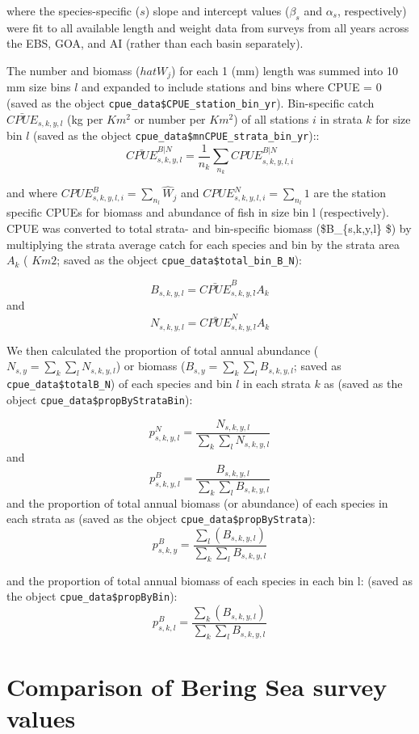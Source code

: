 \documentclass[
]{article}
\begin{document}
where the species-specific (\(s\)) slope and intercept values
(\(\beta_s\) and \(\alpha_s\), respectively) were fit to all available
length and weight data from surveys from all years across the EBS, GOA,
and AI (rather than each basin separately).

The number and biomass (\(hat{W_j}\)) for each 1 (mm) length was summed
into 10 mm size bins \(l\) and expanded to include stations and bins
where CPUE = 0 (saved as the object
\texttt{cpue\_data\$CPUE\_station\_bin\_yr}). Bin-specific catch
\(\bar{CPUE}_{s,k,y,l}\) (kg per \(Km^2\) or number per \(Km^2\)) of all
stations \(i\) in strata \(k\) for size bin \(l\) (saved as the object
\texttt{cpue\_data\$mnCPUE\_strata\_bin\_yr})::
\[\bar{CPUE}^{B|N}_{s,k,y,l}=\frac{1}{n_k}\sum_{n_k}{CPUE^{B|N}_{s,k,y,l,i}}\]

and where \(CPUE^B_{s,k,y,l,i} = \sum_{n_l}\hat{W}_j\) and
\(CPUE^N_{s,k,y,l,i} = \sum_{n_l}1\) are the station specific CPUEs for
biomass and abundance of fish in size bin l (respectively). CPUE was
converted to total strata- and bin-specific biomass (\$B\_\{s,k,y,l\}
\$) by multiplying the strata average catch for each species and bin by
the strata area \(A_{k}\) ( \(Km2\); saved as the object
\texttt{cpue\_data\$total\_bin\_B\_N}):

\[B_{s,k,y,l} =  \bar{CPUE}^{B}_{s,k,y,l} \dot{}A_{k}\] and
\[N_{s,k,y,l} =  \bar{CPUE}^{N}_{s,k,y,l} \dot{}A_{k}\]

We then calculated the proportion of total annual abundance
(\(N_{s,y}= \sum_k{\sum_l{N_{s,k,y,l}}}\)) or biomass
(\(B_{s,y}= \sum_k{\sum_l{B_{s,k,y,l}}}\); saved as
\texttt{cpue\_data\$totalB\_N}) of each species and bin \(l\) in each
strata \(k\) as (saved as the object
\texttt{cpue\_data\$propByStrataBin}):

\[p^N_{s,k,y,l} = \frac{N_{s,k,y,l}}{ \sum_k{\sum_l{N_{s,k,y,l}}}}\] and
\[p^B_{s,k,y,l} = \frac{B_{s,k,y,l}}{ \sum_k{\sum_l{B_{s,k,y,l}}}}\] and
the proportion of total annual biomass (or abundance) of each species in
each strata as (saved as the object \texttt{cpue\_data\$propByStrata}):
\[p^B_{s,k,y} = \frac{\sum_l({B_{s,k,y,l}})}{ \sum_k{\sum_l{B_{s,k,y,l}}}}\]

and the proportion of total annual biomass of each species in each bin
l: (saved as the object \texttt{cpue\_data\$propByBin}):
\[p^B_{s,k,l} = \frac{\sum_k({B_{s,k,y,l}})}{ \sum_k{\sum_l{B_{s,k,y,l}}}}\]

\hypertarget{comparison-of-bering-sea-survey-values}{%
\section{Comparison of Bering Sea survey
values}\label{comparison-of-bering-sea-survey-values}}
\end{document}
